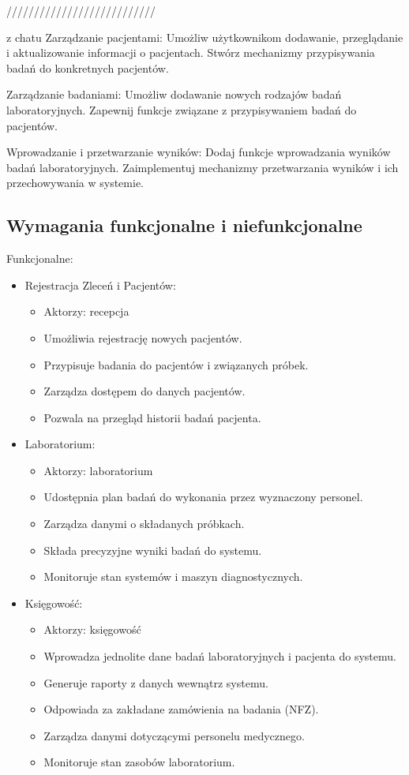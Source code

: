 \documentclass[12pt,a4paper]{article}
\begin{document}
///////////////////////////

z chatu
Zarządzanie pacjentami:
Umożliw użytkownikom dodawanie, przeglądanie i aktualizowanie informacji o pacjentach.
Stwórz mechanizmy przypisywania badań do konkretnych pacjentów.

Zarządzanie badaniami:
Umożliw dodawanie nowych rodzajów badań laboratoryjnych.
Zapewnij funkcje związane z przypisywaniem badań do pacjentów.

Wprowadzanie i przetwarzanie wyników:
Dodaj funkcje wprowadzania wyników badań laboratoryjnych.
Zaimplementuj mechanizmy przetwarzania wyników i ich przechowywania w systemie.


\subsection{Wymagania funkcjonalne i niefunkcjonalne}
Funkcjonalne:
\begin{itemize}
\item Rejestracja Zleceń i Pacjentów:
  \begin{itemize}
  \item Aktorzy: recepcja
  \item Umożliwia rejestrację nowych pacjentów.
  \item Przypisuje badania do pacjentów i związanych próbek.
  \item Zarządza dostępem do danych pacjentów.
  \item Pozwala na przegląd historii badań pacjenta.
  \end{itemize}
  
\item Laboratorium:
  \begin{itemize}
  \item Aktorzy: laboratorium
  \item Udostępnia plan badań do wykonania przez wyznaczony personel.
  \item Zarządza danymi o składanych próbkach.
  \item Składa precyzyjne wyniki badań do systemu.
  \item Monitoruje stan systemów i maszyn diagnostycznych.
  \end{itemize}
  
\item Księgowość:
  \begin{itemize}
  \item Aktorzy: księgowość
  \item Wprowadza jednolite dane badań laboratoryjnych i pacjenta do systemu.
  \item Generuje raporty z danych wewnątrz systemu.
  \item Odpowiada za zakładane zamówienia na badania (NFZ).
  \item Zarządza danymi dotyczącymi personelu medycznego.
  \item Monitoruje stan zasobów laboratorium.
  \end{itemize}
\end{itemize}
\end{document}
